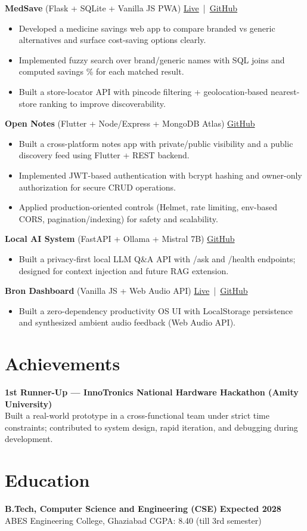 \documentclass[11pt,a4paper]{article}
\newcommand{\resitem}[1]{\item \small #1}
\newcommand{\projspace}{\vspace{1pt}} %
\begin{document}
\textbf{MedSave} (Flask + SQLite + Vanilla JS PWA) \hfill
\href{https://medsave-bqf3.onrender.com}{Live} \,|\, \href{https://github.com/raghavendrashivam474/medsave}{GitHub}
\begin{itemize}
  \resitem{Developed a medicine savings web app to compare branded vs generic alternatives and surface cost-saving options clearly.}
  \resitem{Implemented fuzzy search over brand/generic names with SQL joins and computed savings \% for each matched result.}
  \resitem{Built a store-locator API with pincode filtering + geolocation-based nearest-store ranking to improve discoverability.}
\end{itemize}
\projspace

\textbf{Open Notes} (Flutter + Node/Express + MongoDB Atlas) \hfill
\href{https://github.com/raghavendrashivam474/open-notes}{GitHub}
\begin{itemize}
  \resitem{Built a cross-platform notes app with private/public visibility and a public discovery feed using Flutter + REST backend.}
  \resitem{Implemented JWT-based authentication with bcrypt hashing and owner-only authorization for secure CRUD operations.}
  \resitem{Applied production-oriented controls (Helmet, rate limiting, env-based CORS, pagination/indexing) for safety and scalability.}
\end{itemize}
\projspace

\textbf{Local AI System} (FastAPI + Ollama + Mistral 7B) \hfill
\href{https://github.com/raghavendrashivam474/ai-system}{GitHub}
\begin{itemize}
  \resitem{Built a privacy-first local LLM Q\&A API with /ask and /health endpoints; designed for context injection and future RAG extension.}
\end{itemize}
\projspace

\textbf{Bron Dashboard} (Vanilla JS + Web Audio API) \hfill
\href{https://brondash.netlify.app/}{Live} \,|\, \href{https://github.com/raghavendrashivam474/bron-dashboard}{GitHub}
\begin{itemize}
  \resitem{Built a zero-dependency productivity OS UI with LocalStorage persistence and synthesized ambient audio feedback (Web Audio API).}
\end{itemize}

\section*{Achievements}
\small
\textbf{1st Runner-Up — InnoTronics National Hardware Hackathon (Amity University)} \\
Built a real-world prototype in a cross-functional team under strict time constraints; contributed to system design, rapid iteration, and debugging during development.

\section*{Education}
\small
\textbf{B.Tech, Computer Science and Engineering (CSE)} \hfill \textbf{Expected 2028} \\
ABES Engineering College, Ghaziabad \hfill CGPA: 8.40 (till 3rd semester)
\end{document}
